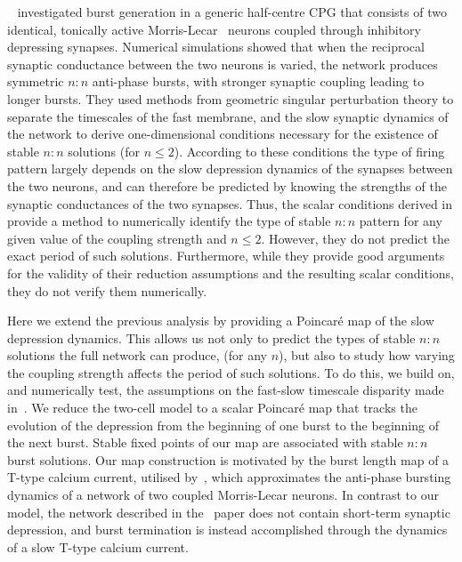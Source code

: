 ~\citet{bose2011} investigated burst generation in a generic half-centre CPG that consists
of two identical, tonically active Morris-Lecar~\citep{morris1981} neurons coupled through
inhibitory depressing synapses.
Numerical simulations showed that when the reciprocal synaptic conductance between the two neurons is varied, the network produces symmetric $n:n$ anti-phase bursts, with stronger synaptic coupling leading to longer bursts.
They used methods from geometric singular perturbation theory to separate the timescales of the fast membrane, and the slow synaptic dynamics of the network to derive one-dimensional conditions necessary for the existence of stable $n:n$ solutions (for $n\leq 2$).
According to these conditions the type of firing pattern largely depends on the slow
depression dynamics of the synapses between the two neurons, and can therefore be
predicted by knowing the strengths of the synaptic conductances of the two synapses.
Thus, the scalar conditions derived in \citet{bose2011} provide a method to numerically
identify the type of stable $n:n$ pattern for any given value of the coupling strength and $n\leq 2$.
However, they do not predict the exact period of such solutions.
Furthermore, while they provide good arguments for the validity of their reduction assumptions and the resulting scalar conditions, they do not verify them numerically.

Here we extend the previous analysis by providing a Poincaré map of the slow depression
dynamics.
This allows us not only to predict the types of stable $n:n$ solutions the full
network can produce, (for any $n$), but also to study how varying the coupling strength
affects the period of such solutions.
To do this, we build on, and numerically test, the
assumptions on the fast-slow timescale disparity made in~\cite{bose2011}.
We reduce the two-cell model to a scalar Poincaré map that tracks the evolution of the depression from the beginning of one burst to the beginning of the next burst.
Stable fixed points of our map are associated with stable $n:n$ burst solutions.
Our map construction is motivated by the burst length map of a T-type calcium current, utilised by~\citet{matveev2007}, which approximates the anti-phase bursting dynamics of a network of two coupled Morris-Lecar neurons.
In contrast to our model, the network described in the~\cite{matveev2007} paper does not contain short-term synaptic depression, and burst termination is instead accomplished through the dynamics of a slow T-type calcium current.

